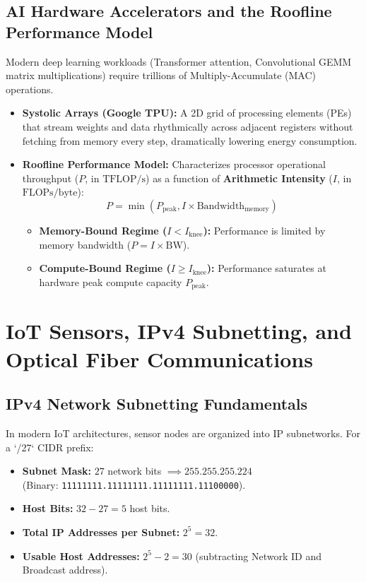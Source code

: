 \subsection{AI Hardware Accelerators and the Roofline Performance Model}
Modern deep learning workloads (Transformer attention, Convolutional GEMM matrix multiplications) require trillions of Multiply-Accumulate (MAC) operations.
\begin{itemize}
    \item \textbf{Systolic Arrays (Google TPU):} A 2D grid of processing elements (PEs) that stream weights and data rhythmically across adjacent registers without fetching from memory every step, dramatically lowering energy consumption.
    \item \textbf{Roofline Performance Model:} Characterizes processor operational throughput ($P$, in $\text{TFLOP/s}$) as a function of \textbf{Arithmetic Intensity} ($I$, in $\text{FLOPs/byte}$):
    \begin{equation}
        P = \min\left(P_{\text{peak}}, I \times \text{Bandwidth}_{\text{memory}}\right)
    \end{equation}
    \begin{itemize}
        \item \textbf{Memory-Bound Regime ($I < I_{\text{knee}}$):} Performance is limited by memory bandwidth ($P = I \times \text{BW}$).
        \item \textbf{Compute-Bound Regime ($I \ge I_{\text{knee}}$):} Performance saturates at hardware peak compute capacity $P_{\text{peak}}$.
    \end{itemize}
\end{itemize}

\section{IoT Sensors, IPv4 Subnetting, and Optical Fiber Communications}
\subsection{IPv4 Network Subnetting Fundamentals}
In modern IoT architectures, sensor nodes are organized into IP subnetworks. For a `/27` CIDR prefix:
\begin{itemize}
    \item \textbf{Subnet Mask:} $27$ network bits $\implies \mathtt{255.255.255.224}$ \\ (Binary: \texttt{11111111.11111111.11111111.11100000}).
    \item \textbf{Host Bits:} $32 - 27 = 5$ host bits.
    \item \textbf{Total IP Addresses per Subnet:} $2^5 = 32$.
    \item \textbf{Usable Host Addresses:} $2^5 - 2 = 30$ (subtracting Network ID and Broadcast address).
\end{itemize}

